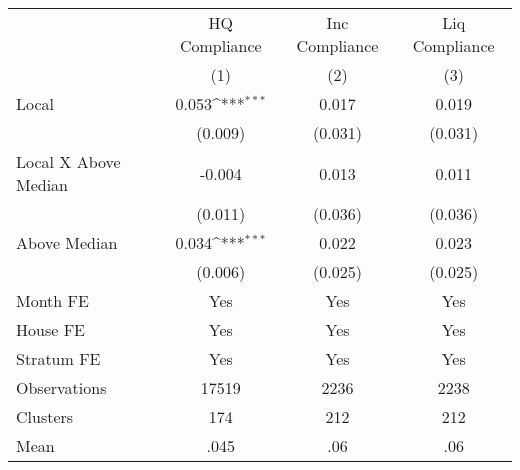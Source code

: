 {
\def\sym#1{\ifmmode^{#1}\else\(^{#1}\)\fi}
\begin{tabular}{l*{3}{c}}
\hline\hline
                &\multicolumn{1}{c}{HQ Compliance}&\multicolumn{1}{c}{Inc Compliance}&\multicolumn{1}{c}{Liq Compliance}\\
                &\multicolumn{1}{c}{(1)}         &\multicolumn{1}{c}{(2)}         &\multicolumn{1}{c}{(3)}         \\
\hline
Local           &    0.053\sym{***}&    0.017         &    0.019         \\
                &  (0.009)         &  (0.031)         &  (0.031)         \\
Local X Above Median&   -0.004         &    0.013         &    0.011         \\
                &  (0.011)         &  (0.036)         &  (0.036)         \\
Above Median    &    0.034\sym{***}&    0.022         &    0.023         \\
                &  (0.006)         &  (0.025)         &  (0.025)         \\
Month FE        &      Yes         &      Yes         &      Yes         \\
House FE        &      Yes         &      Yes         &      Yes         \\
Stratum FE      &      Yes         &      Yes         &      Yes         \\
\hline
Observations    &    17519         &     2236         &     2238         \\
Clusters        &      174         &      212         &      212         \\
Mean            &     .045         &      .06         &      .06         \\
\hline\hline
\end{tabular}
}
